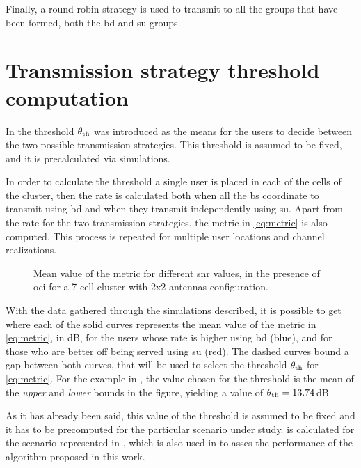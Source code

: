 Finally, a round-robin strategy is used to transmit to all the groups that have
been formed, both the \gls{bd} and \gls{su} groups.

\section{Transmission strategy threshold computation}
\label{ssec:sched_threshold}

In  the threshold $\theta_{\text{th}}$ was introduced as the
means for the users to decide between the two possible transmission strategies.
This threshold is assumed to be fixed, and it is precalculated via simulations.

In order to calculate the threshold a single user is placed in each of the cells
of the cluster, then the rate is calculated both when all the \gls{bs}
coordinate to transmit using \gls{bd} and when they transmit independently using
\gls{su}. Apart from the rate for the two transmission strategies, the metric in
\eqref{eq:metric} is also computed. This process is repeated for multiple user
locations and channel realizations.

\begin{figure}[t]
    \centering
    \begin{minipage}[t]{0.7\textwidth}
        
    \end{minipage}
    \caption{Mean value of the metric for different \gls{snr} values, in the
    presence of \gls{oci} for a 7 cell cluster with 2x2 antennas configuration.}
    \label{fig:threshold_2x2}
\end{figure}

With the data gathered through the simulations described, it is possible to get
 where each of the solid curves represents the mean
value of the metric in \eqref{eq:metric}, in dB, for the users whose rate is
higher using \gls{bd} (blue), and for those who are better off being served
using \gls{su} (red). The dashed curves bound a gap between both curves, that
will be used to select the threshold $\theta_{\text{th}}$ for \eqref{eq:metric}.
For the example in , the value chosen for the threshold
is the mean of the \emph{upper} and \emph{lower} bounds in the figure, yielding
a value of $\theta_{\text{th}} = 13.74$\,dB.

As it has already been said, this value of the threshold is assumed to be fixed
and it has to be precomputed for the particular scenario under study.
 is calculated for the scenario represented in
, which is also used in
 to asses the performance of the algorithm proposed
in this work.

